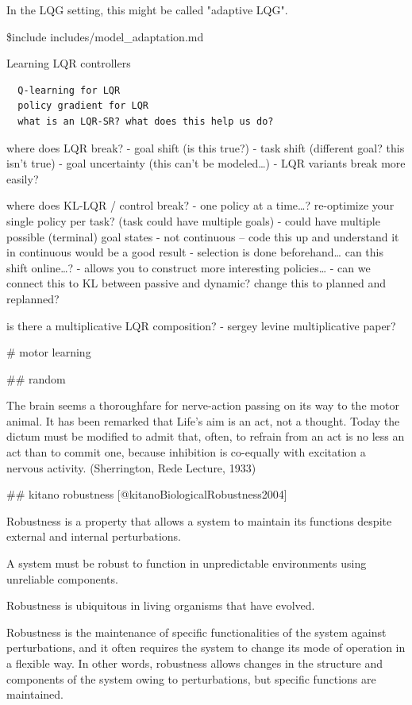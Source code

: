 \documentclass[../main.tex]{subfiles}
\begin{document}
{{{  In the LQG setting, this might be called "adaptive LQG".
  
  \$include includes/model\_adaptation.md
  
  Learning LQR controllers
  
  \begin{verbatim}
  Q-learning for LQR
  policy gradient for LQR
  what is an LQR-SR? what does this help us do?
  \end{verbatim}
  
  where does LQR break? - goal shift (is this true?) - task shift
  (different goal? this isn't true) - goal uncertainty (this can't be
  modeled\ldots) - LQR variants break more easily?
  
  where does KL-LQR / control break? - one policy at a time\ldots?
  re-optimize your single policy per task? (task could have multiple
  goals) - could have multiple possible (terminal) goal states - not
  continuous -- code this up and understand it in continuous would be a
  good result - selection is done beforehand\ldots{} can this shift
  online\ldots? - allows you to construct more interesting
  policies\ldots{} - can we connect this to KL between passive and
  dynamic? change this to planned and replanned?
  
  is there a multiplicative LQR composition? - sergey levine
  multiplicative paper?
  

# motor learning

## random 

The brain seems a thoroughfare for nerve-action passing on its way to the motor animal. It has been remarked that Life’s aim is an act, not a thought. Today the dictum must be modified to admit that, often, to refrain from an act is no less an act than to commit one, because inhibition is co-equally with excitation a nervous activity. (Sherrington, Rede Lecture, 1933)


## kitano robustness [@kitanoBiologicalRobustness2004]

Robustness is a property that allows a system to maintain its functions despite external and internal perturbations. 

A system must be robust to function in unpredictable environments using unreliable components. 

Robustness is ubiquitous in living organisms that have evolved. 

Robustness is the maintenance of specific functionalities of the system against perturbations, and it often requires the system to change its mode of operation in a flexible way. In other words, robustness allows changes in the structure and components of the system owing to perturbations, but specific functions are maintained.

}}}
\end{document}
